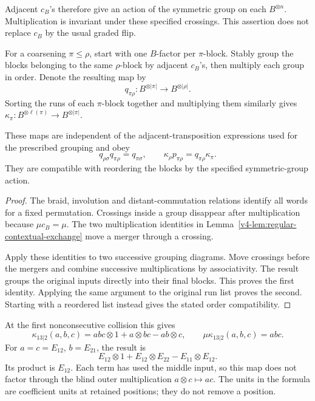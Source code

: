 Adjacent \(c_B\)'s therefore give an action of the
symmetric group on each \(B^{\otimes n}\).
Multiplication is invariant under these specified
crossings. This assertion does not replace \(c_B\)
by the usual graded flip.

For a coarsening \(\pi\leq\rho\), start with one
\(B\)-factor per \(\pi\)-block. Stably group the
blocks belonging to the same \(\rho\)-block by
adjacent \(c_B\)'s, then multiply each group in order.
Denote the resulting map by
\[
 q_{\pi\rho}:B^{\otimes|\pi|}
                  \longrightarrow B^{\otimes|\rho|}.
\]
Sorting the runs of each \(\pi\)-block together and
multiplying them similarly gives
\(\kappa_\pi:B^{\otimes\ell(\pi)}\to B^{\otimes|\pi|}\).

\begin{proposition}\label{v4-prop:regular-contextual-coherence}
These maps are independent of the adjacent-transposition
expressions used for the prescribed grouping and obey
\[
 q_{\rho\sigma}q_{\pi\rho}=q_{\pi\sigma},
 \qquad
 \kappa_\rho p_{\pi\rho}=q_{\pi\rho}\kappa_\pi.
\]
They are compatible with reordering the blocks by
the specified symmetric-group action.
\end{proposition}

\begin{proof}
The braid, involution and distant-commutation relations
identify all words for a fixed permutation. Crossings
inside a group disappear after multiplication because
\(\mu c_B=\mu\). The two multiplication identities
in Lemma~\ref{v4-lem:regular-contextual-exchange}
move a merger through a crossing.

Apply these identities to two successive grouping
diagrams. Move crossings before the mergers and combine
successive multiplications by associativity. The result
groups the original inputs directly into their final
blocks. This proves the first identity. Applying the
same argument to the original run list proves the
second. Starting with a reordered list instead gives
the stated order compatibility.
\end{proof}

At the first nonconsecutive collision this gives
\begin{equation}\label{v4-eq:regular-contextual-three}
 \kappa_{13|2}(a,b,c)
       =abc\otimes1+a\otimes bc-ab\otimes c,
 \qquad
 \mu\kappa_{13|2}(a,b,c)=abc.
\end{equation}
For \(a=c=E_{12}\), \(b=E_{21}\), the result is
\[
 E_{12}\otimes1+E_{12}\otimes E_{22}
                  -E_{11}\otimes E_{12}.
\]
Its product is \(E_{12}\). Each term has used the
middle input, so this map does not factor through
the blind outer multiplication \(a\otimes c\mapsto ac\).
The units in the formula are coefficient units at
retained positions; they do not remove a position.

